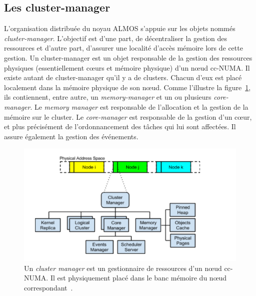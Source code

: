     
    \subsection{Les cluster-manager}

      L'organisation distribuée du noyau ALMOS s’appuie sur les objets nommés
      \textit{cluster-manager}. L’objectif est d’une part, de décentraliser la
      gestion des ressources et d’autre part, d’assurer une localité d’accès
      mémoire lors de cette gestion. Un cluster-manager est un objet responsable
      de la gestion des ressources physiques (essentiellement c\oe urs et
      mémoire physique) d’un nœud cc-NUMA. Il existe autant de cluster-manager
      qu’il y a de clusters. Chacun d'eux est placé localement dans la mémoire
      physique de son n\oe ud. Comme l'illustre la
      figure~\ref{fig:cluster_manager}, ils contiennent, entre autre, un
      \textit{memory-manager} et un ou plusieurs \textit{core-manager}.  Le
      \textit{memory manager} est responsable de l'allocation et la gestion de
      la mémoire sur le cluster. Le \textit{core-manager} est responsable de la
      gestion d’un c\oe ur, et plus précisément de l'ordonnancement des tâches
      qui lui sont affectées. Il assure également la gestion des événements. %

      \begin{figure}[ht]
        \centering
        \includegraphics[scale=0.8]{include/img/cluster_manager}
        \caption{Un \textit{cluster manager} est un gestionnaire de ressources
          d'un n\oe ud cc-NUMA. Il est physiquement placé dans le banc mémoire
          du n\oe ud correspondant~\citep{almaless2014universite}.}
        \label{fig:cluster_manager}
      \end{figure}

